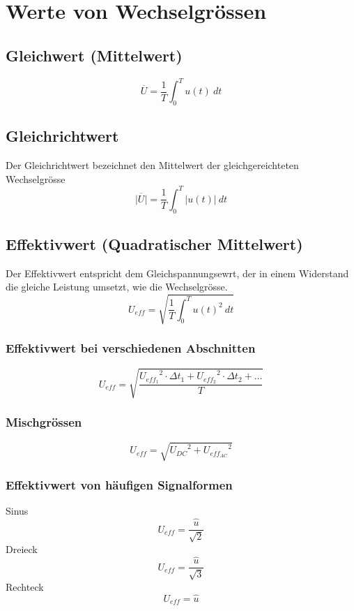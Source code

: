 



\section{Werte von Wechselgrössen}

\subsection{Gleichwert (Mittelwert)}
\[ \overline{U} = \frac{1}{T} \int_0^T u(t) ~ dt \]

\subsection{Gleichrichtwert}
Der Gleichrichtwert bezeichnet den Mittelwert der gleichgereichteten 
Wechselgrösse
\[ \overline{|U|} = \frac{1}{T} \int_0^T |u(t)| ~ dt \]

\subsection{Effektivwert (Quadratischer Mittelwert)}
Der Effektivwert entspricht dem Gleichspannungsewrt, der in einem Widerstand 
die gleiche Leistung umsetzt, wie die Wechselgrösse. 
\[ U_{eff} = \sqrt{\frac{1}{T} \int_0^T u(t)^2 ~ dt} \]

\subsubsection{Effektivwert bei verschiedenen Abschnitten}
\[ U_{eff} = \sqrt{\frac{{U_{eff_1}}^2 \cdot \Delta t_1 
+ {U_{eff_2}}^2 \cdot \Delta t_2 + \dots}{T}} \]

\subsubsection{Mischgrössen}
\[ U_{eff} = \sqrt{{U_{DC}}^2 + {U_{eff_{AC}}}^2} \]

\subsubsection{Effektivwert von häufigen Signalformen}
Sinus
\[ U_{eff} = \frac{\hat{u}}{\sqrt{2}} \]
%
Dreieck
\[ U_{eff} = \frac{\hat{u}}{\sqrt{3}} \]
%
Rechteck
\[ U_{eff} = \hat{u} \]